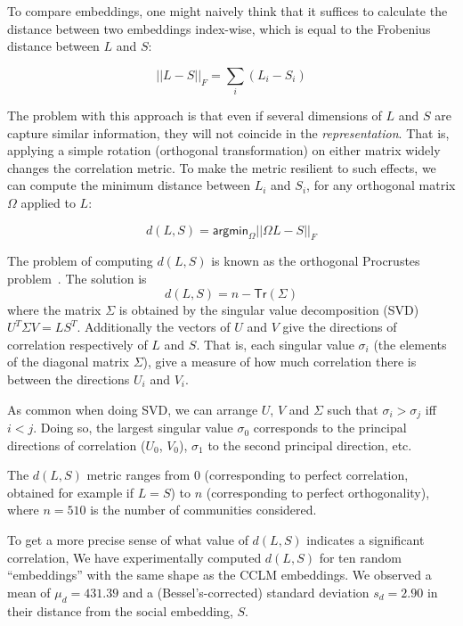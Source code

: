 \documentclass[11pt]{article}
\begin{document}
To compare embeddings, one might naively think that it suffices to
calculate the distance between two embeddings index-wise, which is
equal to the Frobenius distance between \(L\) and \(S\):

\[||L-S||_F = \sum_i (L_i - S_i)\]

The problem with this approach is that even if several dimensions of
\(L\) and \(S\) are capture similar information, they will not
coincide in the \emph{representation}. That is, applying a simple
rotation (orthogonal transformation) on either matrix widely changes
the correlation metric. To make the metric resilient to such effects,
we can compute the minimum distance between \(L_i\) and \(S_i\), for
any orthogonal matrix \(\Omega\) applied to \(L\):

\[d(L,S) = \mathsf{argmin}_\Omega ||ΩL-S||_F\]

The problem of computing \(d(L,S)\) is known as the orthogonal Procrustes problem~\citep{Gower2004}. The
solution is
\[d(L,S) = n - \mathsf {Tr} (Σ)\] where the matrix \(Σ\) is obtained by the singular value
decomposition (SVD) \(U^TΣV = LS^T\). Additionally the vectors of \(U\) and \(V\) give
the directions of correlation respectively of \(L\) and \(S\). That is, each
singular value \(\sigma_i\) (the elements of the diagonal matrix \(Σ\)), give a measure of how much
correlation there is between the directions \(U_i\) and \(V_i\).

As common when doing SVD, we can arrange \(U\), \(V\) and \(Σ\) such
that \(σ_i > σ_j\) iff \(i < j\). Doing so, the largest singular value
\(σ_0\) corresponds to the principal directions of correlation
(\(U_0\), \(V_0\)), \(σ_1\) to the second principal direction, etc.

The \(d(L,S)\) metric ranges from \(0\) (corresponding to perfect
correlation, obtained for example if \(L=S\)) to \(n\) (corresponding
to perfect orthogonality), where $n=510$ is the number of communities
considered.

To get a more precise sense of what value of \(d(L,S)\) indicates a significant correlation,
We have experimentally computed \(d(L,S)\) for ten random  ``embeddings'' 
with the same shape as the CCLM embeddings.
We observed a mean of \(μ_d=431.39\) and a (Bessel's-corrected) 
standard deviation \(s_d=2.90\) in their distance from the social embedding, \(S\). %
\end{document}
